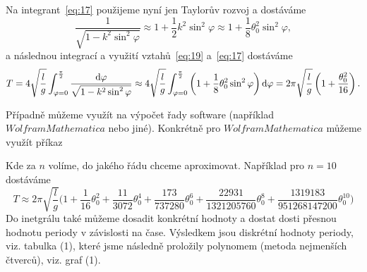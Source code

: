 \documentclass[reqno, a4paper]{amsart}
\begin{document}
		Na integrant~\eqref{eq:17} použijeme nyní jen Taylorův rozvoj a dostáváme
		\begin{equation}
			\label{eq:19}
			\frac{1}
			{
				\sqrt{1 - k^2 \sin^2 \varphi}
			}
			\approx
			1
			+
			\frac{1}{2}
			k^2
			\sin^2 \varphi
			\approx
			1
			+
			\frac{1}{8}
			\theta_{0}^2
			\sin^2 \varphi
			,
		\end{equation}
		a následnou integrací a využití vztahů~\eqref{eq:19} a~\eqref{eq:17} dostáváme
		\begin{equation}
			\label{eq:20}
			T
			=
			4
			\sqrt{
				\frac{l}{g}
			}
			\int_{\varphi=0}^{\frac{\pi}{2}}
			\frac{\mathrm{d} \varphi}
			{
				\sqrt{1 - k^2 \sin^2 \varphi}
			}
			\approx
			4
			\sqrt{
				\frac{l}{g}
			}
			\int_{\varphi=0}^{\frac{\pi}{2}}
			\left(
			1
			+
			\frac{1}{8}
			\theta_{0}^2
			\sin^2 \varphi
			\right)
			\mathrm{d} \varphi
			=
			2\pi
			\sqrt{\frac{l}{g}}
			\left(
			1
			+
			\frac{\theta_{0}^2}{16}
			\right)
			.
		\end{equation}
		
		Případně můžeme využít na výpočet řady software (například $ Wolfram Mathematica $ nebo jiné). Konkrétně pro $ Wolfram Mathematica $ můžeme využít příkaz
		
		\begin{verbatim*}
			
			k=Sin[\[Theta]/2]
			Series[1/(Sqrt[1-k^2*(Sin[x])^2]),{\[Theta],0,4}]
			Integrate[4*Sqrt[l/g]*Series[1/(Sqrt[1-k^2*(Sin[x])^2]),{\[Theta],0,n}],{x,0,Pi/2}]
			
		\end{verbatim*}
		Kde za $ n $ volíme, do jakého řádu chceme aproximovat. Například pro $ n=10 $ dostáváme
		\begin{equation}
			\label{eq:21}
			T
			\approx
			2 \pi \sqrt{\frac{l}{g}} \bigg(  1 +\frac{1}{16}\theta_{0} ^2+\frac{11}{3072}\theta_{0} ^4+\frac{173}{737280} \theta_{0} ^6 +\frac{22931}{1321205760} \theta_{0} ^8 
			+\frac{1319183}{951268147200} \theta_{0} ^{10} \bigg)
		\end{equation}
		Do inetgrálu také můžeme dosadit konkrétní hodnoty a dostat dosti přesnou hodnotu periody v závislosti na čase. Výsledkem jsou diskrétní hodnoty periody, viz. tabulka (1), které jsme následně proložily polynomem (metoda nejmenších čtverců), viz. graf (1).\\
		 
\end{document}
